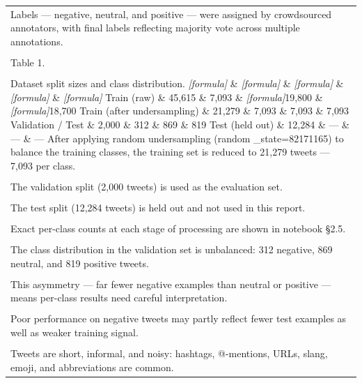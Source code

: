 \documentclass[11pt]{article}
\begin{document}
\begin{longtable}{|p{\dimexpr\linewidth-2\tabcolsep-2\arrayrulewidth\relax}|}
\hline
\rule{0pt}{3.5cm} \\
\hline
Labels --- negative, neutral, and positive --- were assigned by crowdsourced annotators, with final labels reflecting majority vote across multiple annotations. \\[2pt]
\hline
\rule{0pt}{3.5cm} \\
\hline
Table 1. \\[2pt]
\hline
\rule{0pt}{3.5cm} \\
\hline
Dataset split sizes and class distribution. \textit{[formula]} \& \textit{[formula]} \& \textit{[formula]} \& \textit{[formula]} \& \textit{[formula]} Train (raw) \& 45,615 \& 7,093 \& \textit{[formula]}19,800 \& \textit{[formula]}18,700 Train (after undersampling) \& 21,279 \& 7,093 \& 7,093 \& 7,093 Validation / Test \& 2,000 \& 312 \& 869 \& 819 Test (held out) \& 12,284 \& --- \& --- \& --- After applying random undersampling (random \_state=82171165) to balance the training classes, the training set is reduced to 21,279 tweets --- 7,093 per class. \\[2pt]
\hline
\rule{0pt}{3.5cm} \\
\hline
The validation split (2,000 tweets) is used as the evaluation set. \\[2pt]
\hline
\rule{0pt}{3.5cm} \\
\hline
The test split (12,284 tweets) is held out and not used in this report. \\[2pt]
\hline
\rule{0pt}{3.5cm} \\
\hline
Exact per-class counts at each stage of processing are shown in notebook §2.5. \\[2pt]
\hline
\rule{0pt}{3.5cm} \\
\hline
The class distribution in the validation set is unbalanced: 312 negative, 869 neutral, and 819 positive tweets. \\[2pt]
\hline
\rule{0pt}{3.5cm} \\
\hline
This asymmetry --- far fewer negative examples than neutral or positive --- means per-class results need careful interpretation. \\[2pt]
\hline
\rule{0pt}{3.5cm} \\
\hline
Poor performance on negative tweets may partly reflect fewer test examples as well as weaker training signal. \\[2pt]
\hline
\rule{0pt}{3.5cm} \\
\hline
Tweets are short, informal, and noisy: hashtags, @-mentions, URLs, slang, emoji, and abbreviations are common. \\[2pt]

\end{longtable}
\end{document}
